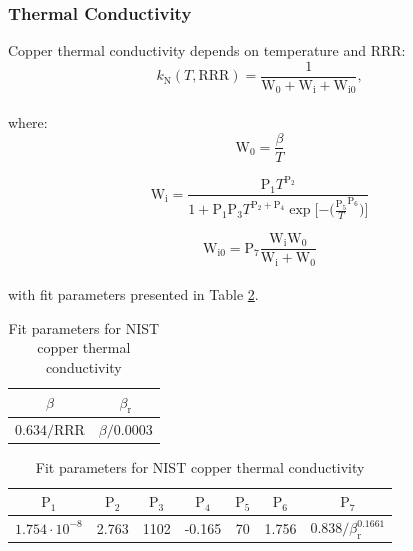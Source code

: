 \subsubsection{Thermal Conductivity}
Copper thermal conductivity depends on temperature and RRR:
\begin{equation}
    k_\text{N}(T, \text{RRR}) = \frac{1}{\text{W}_\text{0} + \text{W}_\text{i} + \text{W}_\text{i0}}, 
\end{equation}
\\ 
where:
\begin{equation}
    \text{W}_\text{0} = \frac{\beta}{T}
\end{equation}

\begin{equation}
    \text{W}_\text{i} = \frac{\text{P}_\text{1} T^{\text{P}_\text{2}}}{1+\text{P}_\text{1}  \text{P}_\text{3}  T^{\text{P}_\text{2} + \text{P}_\text{4}}  \exp{[-(\frac{\text{P}_\text{5}}{T}}^{\text{P}_\text{6}})]}
\end{equation}

\begin{equation}
    \text{W}_\text{i0} = \text{P}_\text{7} \frac{\text{W}_\text{i} \text{W}_\text{0}}{\text{W}_\text{i} + \text{W}_\text{0}}
\end{equation}
\\
with fit parameters presented in Table \ref{table:nist_cu_k_parameters}.

\begin{table}[h!]
    \caption{Fit parameters for NIST copper thermal conductivity} 
    \vspace{-1.em} 
    \fontsize{10}{10}
    \selectfont 
    \renewcommand{\arraystretch}{1.5}
    \begin{center}
    \begin{tabular}{ cc }  
    $\beta$ & $\beta_\text{r}$ \\
    \hline
    $0.634/\text{RRR}$ & $\beta/0.0003$ \\
    \hline
    \end{tabular}
    
    \begin{tabular}{ ccccccc }  
    $\text{P}_1$ & $\text{P}_2$ & $\text{P}_3$ & $\text{P}_4$ & $\text{P}_5$ & $\text{P}_6$ & $\text{P}_7$ \\
    \hline
    $1.754\cdot10^{-8}$ & 2.763 & 1102 & -0.165 & 70 & 1.756 & $0.838/\beta_\text{r}^{0.1661}$ \\
    \hline 
    \end{tabular}
    \end{center}  
     \label{table:nist_cu_k_parameters} 
 \end{table}
 
